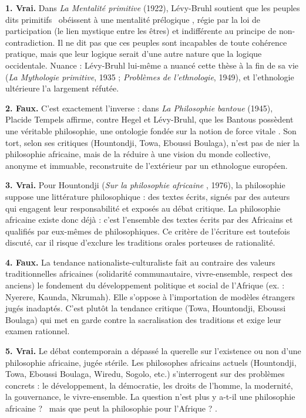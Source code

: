 \documentclass[11pt]{article}
\begin{document}
\begin{corrige}

\textbf{1. Vrai.} Dans \emph{La Mentalité primitive} (1922), Lévy-Bruhl soutient que les peuples dits \guillemotleft primitifs \guillemotright\ obéissent à une mentalité \guillemotleft prélogique \guillemotright, régie par la loi de participation (le lien mystique entre les êtres) et indifférente au principe de non-contradiction. Il ne dit pas que ces peuples sont incapables de toute cohérence pratique, mais que leur logique serait d'une autre nature que la logique occidentale. Nuance : Lévy-Bruhl lui-même a nuancé cette thèse à la fin de sa vie (\emph{La Mythologie primitive}, 1935 ; \emph{Problèmes de l'ethnologie}, 1949), et l'ethnologie ultérieure l'a largement réfutée.

\textbf{2. Faux.} C'est exactement l'inverse : dans \emph{La Philosophie bantoue} (1945), Placide Tempels affirme, contre Hegel et Lévy-Bruhl, que les Bantous possèdent une véritable philosophie, une ontologie fondée sur la notion de \guillemotleft force vitale \guillemotright. Son tort, selon ses critiques (Hountondji, Towa, Eboussi Boulaga), n'est pas de nier la philosophie africaine, mais de la réduire à une vision du monde collective, anonyme et immuable, reconstruite de l'extérieur par un ethnologue européen.

\textbf{3. Vrai.} Pour Hountondji (\emph{Sur la \guillemotleft philosophie africaine \guillemotright}, 1976), la philosophie suppose une littérature philosophique : des textes écrits, signés par des auteurs qui engagent leur responsabilité et exposés au débat critique. La philosophie africaine existe donc déjà : c'est l'ensemble des textes écrits par des Africains et qualifiés par eux-mêmes de philosophiques. Ce critère de l'écriture est toutefois discuté, car il risque d'exclure les traditions orales porteuses de rationalité.

\textbf{4. Faux.} La tendance nationaliste-culturaliste fait au contraire des valeurs traditionnelles africaines (solidarité communautaire, vivre-ensemble, respect des anciens) le fondement du développement politique et social de l'Afrique (ex. : Nyerere, Kaunda, Nkrumah). Elle s'oppose à l'importation de modèles étrangers jugés inadaptés. C'est plutôt la tendance critique (Towa, Hountondji, Eboussi Boulaga) qui met en garde contre la sacralisation des traditions et exige leur examen rationnel.

\textbf{5. Vrai.} Le débat contemporain a dépassé la querelle sur l'existence ou non d'une philosophie africaine, jugée stérile. Les philosophes africains actuels (Hountondji, Towa, Eboussi Boulaga, Wiredu, Sogolo, etc.) s'interrogent sur des problèmes concrets : le développement, la démocratie, les droits de l'homme, la modernité, la gouvernance, le vivre-ensemble. La question n'est plus \guillemotleft y a-t-il une philosophie africaine ? \guillemotright\ mais \guillemotleft que peut la philosophie pour l'Afrique ? \guillemotright.

\end{corrige}
\end{document}
